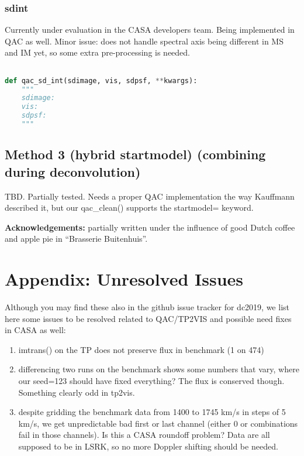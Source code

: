 \documentclass[12pt,a4paper]{article}
\begin{document}
\subsubsection{sdint}

Currently under evaluation in the CASA developers team.  Being implemented in QAC as well.
Minor issue: does not handle spectral axis being different in MS and IM yet, so some extra pre-processing
is needed.

\begin{lstlisting}[language=Python]

def qac_sd_int(sdimage, vis, sdpsf, **kwargs):
    """
    sdimage:
    vis:
    sdpsf:
    """

\end{lstlisting}


\subsection{Method 3 (hybrid startmodel) (combining during deconvolution)}

TBD. Partially tested. Needs a proper QAC implementation the way Kauffmann described it, but our qac\_clean() supports the
startmodel= keyword.

\bigskip
{\bf Acknowledgements:} partially written under the influence of good Dutch coffee and apple pie in ``Brasserie Buitenhuis''.

\clearpage
\section{Appendix: Unresolved Issues}

Although you may find these also in the github issue tracker for dc2019, we list here some issues to be resolved related to QAC/TP2VIS
and possible need fixes in CASA as well:

\begin{enumerate}

\item imtrans() on the TP does not preserve flux in benchmark (1 on 474)
\item differencing two runs on the benchmark shows some numbers that vary, where our seed=123 should have fixed everything?
  The flux is conserved though. Something clearly odd in tp2vis.
\item despite gridding the benchmark data from 1400 to 1745 km/s in steps of 5 km/s, we get unpredictable bad first or last channel
  (either 0 or combinations fail in those channels). Is this a CASA roundoff problem?  Data are all supposed to be in LSRK, so no more
  Doppler shifting should be needed.

\end{enumerate}
\end{document}
